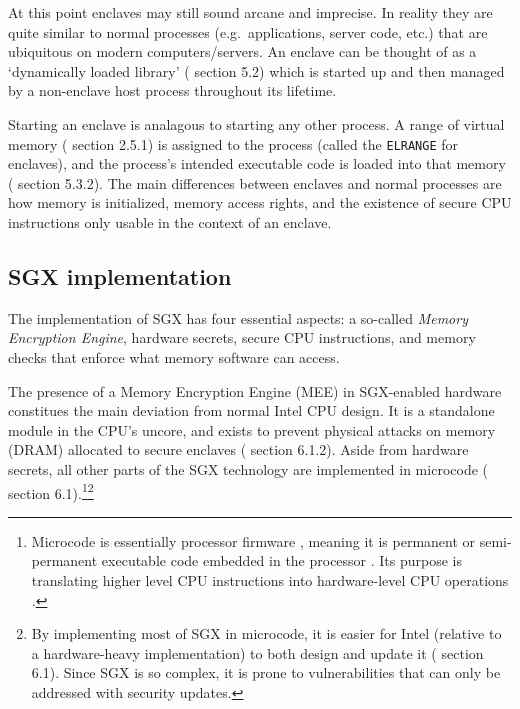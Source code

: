 At this point enclaves may still sound arcane and imprecise. In reality they are quite similar to normal processes (e.g.\ applications, server code, etc.) that are ubiquitous on modern computers/servers. An enclave can be thought of as a `dynamically loaded library' (\cite{intel-sgx-explained-advanced} section 5.2) which is started up and then managed by a non-enclave host process throughout its lifetime.

Starting an enclave is analagous to starting any other process. A range of virtual memory (\cite{intel-sgx-explained-advanced} section 2.5.1) is assigned to the process (called the {\tt ELRANGE} for enclaves), and the process's intended executable code is loaded into that memory (\cite{intel-sgx-explained-advanced} section 5.3.2). The main differences between enclaves and normal processes are how memory is initialized, memory access rights, and the existence of secure CPU instructions only usable in the context of an enclave.


\subsection{SGX implementation}
\label{subsec:enclaves-sgx-implementation}

The implementation of SGX has four essential aspects: a so-called {\em Memory Encryption Engine}, hardware secrets, secure CPU instructions, and memory checks that enforce what memory software can access.

The presence of a Memory Encryption Engine (MEE) \cite{memory-encryption-engine-general-purpose-processors} in SGX-enabled hardware constitues the main deviation from normal Intel CPU design. It is a standalone module in the CPU's uncore, and exists to prevent physical attacks on memory (DRAM) allocated to secure enclaves (\cite{intel-sgx-explained-advanced} section 6.1.2). Aside from hardware secrets, all other parts of the SGX technology are implemented in microcode (\cite{intel-sgx-explained-advanced} section 6.1).\footnote{Microcode is essentially processor firmware \cite{debian-wiki-microcode}, meaning it is permanent or semi-permanent executable code embedded in the processor \cite{simple-wiki-firmware}. Its purpose is translating higher level CPU instructions into hardware-level CPU operations \cite{microcode-vs-firmware}.}\footnote{By implementing most of SGX in microcode, it is easier for Intel (relative to a hardware-heavy implementation) to both design and update it (\cite{intel-sgx-explained-advanced} section 6.1). Since SGX is so complex, it is prone to vulnerabilities \cite{wiki-sgx-attacks} that can only be addressed with security updates.}


